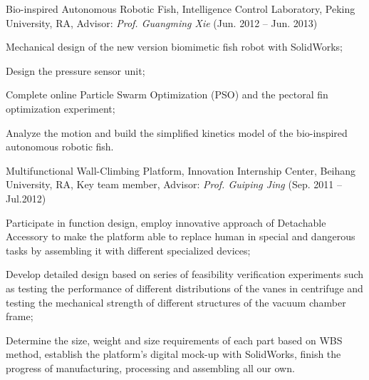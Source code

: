 \documentclass[10pt,letterpaper]{article}
\renewenvironment{itemize}{
  \begin{list}{}{
    \setlength{\leftmargin}{1.5em}
    \setlength{\itemsep}{0.25em}
    \setlength{\parskip}{0pt}
    \setlength{\parsep}{0.25em}
  }
}{
  \end{list}
}
\begin{document}
\begin{itemize}
  \item Bio-inspired Autonomous Robotic Fish, Intelligence Control Laboratory, Peking University, RA, Advisor: \textit{Prof. Guangming Xie} (Jun. 2012 -- Jun. 2013)
  \begin{itemize}
    \item Mechanical design of the new version biomimetic fish robot with SolidWorks;
    \item Design the pressure sensor unit;
    \item Complete online Particle Swarm Optimization (PSO) and the pectoral fin optimization experiment;
    \item Analyze the motion and build the simplified kinetics model of the bio-inspired autonomous robotic fish.
  \end{itemize}

  \item Multifunctional Wall-Climbing Platform, Innovation Internship Center, Beihang University, RA, Key team member, Advisor: \textit{Prof. Guiping Jing} (Sep. 2011 -- Jul.2012)
  \begin{itemize}
    \item Participate in function design, employ innovative approach of Detachable Accessory to make the platform able to replace human in special and dangerous tasks by assembling it with different specialized devices;
    \item Develop detailed design based on series of feasibility verification experiments such as testing the performance of different distributions of the vanes in centrifuge and testing the mechanical strength of different structures of the vacuum chamber frame;
    \item Determine the size, weight and size requirements of each part based on WBS method, establish the platform's digital mock-up with SolidWorks, finish the progress of manufacturing, processing and assembling all our own.
  \end{itemize}


\end{itemize}
\end{document}
